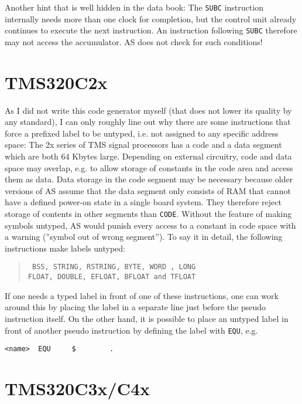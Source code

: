 \documentclass[12pt,twoside]{report}
\newcommand{\tty}[1]{{\tt #1}}
\newcommand{\asname}{{AS}}
\begin{document}
Another hint that is well hidden in the data book: The \tty{SUBC}
instruction internally needs more than one clock for completion, but
the control unit already continues to execute the next instruction.
An instruction following \tty{SUBC} therefore may not access the
accumulator.  \asname{} does not check for such conditions!


\section{TMS320C2x}

As I did not write this code generator myself (that does not lower
its quality by any standard), I can only roughly line out why there
are some instructions that force a prefixed label to be untyped, i.e.
not assigned to any specific address space: The 2x series of TMS
signal processors has a code and a data segment which are both 64
Kbytes large.  Depending on external circuitry, code and data space may
overlap, e.g. to allow storage of constants in the code area and
access them as data.  Data storage in the code segment may be
necessary because older versions of \asname{} assume that the data segment
only consists of RAM that cannot have a defined power-on state in a
single board system.  They therefore reject storage of contents in
other segments than \tty{CODE}.  Without the feature of making symbols
untyped, \asname{} would punish every access to a constant in code space
with a warning (''symbol out of wrong segment'').  To say it in detail,
the following instructions make labels untyped:
\begin{quote}\tt
  BSS, STRING, RSTRING, BYTE, WORD , LONG\\
  FLOAT, DOUBLE, EFLOAT, BFLOAT and TFLOAT
\rm\end{quote}
If one needs a typed label in front of one of these instructions, one
can work around this by placing the label in a separate line just
before the pseudo instruction itself.  On the other hand, it is
possible to place an untyped label in front of another pseudo
instruction by defining the label with \tty{EQU}, e.g.
\begin{verbatim}
<name>  EQU     $        .
\end{verbatim}


\section{TMS320C3x/C4x}
\end{document}

